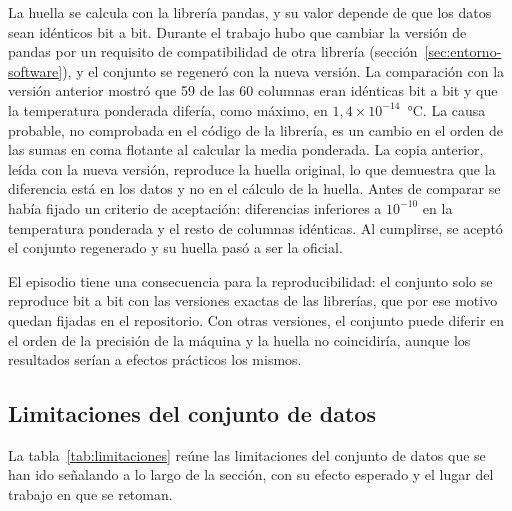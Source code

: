 La huella se calcula con la librería pandas, y su valor depende de que los
datos sean idénticos bit a bit. Durante el trabajo hubo que cambiar la
versión de pandas por un requisito de compatibilidad de otra librería
(sección~\ref{sec:entorno-software}), y el conjunto se regeneró con la
nueva versión. La comparación con la versión anterior mostró que 59 de las
60 columnas eran idénticas bit a bit y que la temperatura ponderada difería,
como máximo, en $1{,}4 \times 10^{-14}$~°C. La causa probable, no comprobada
en el código de la librería, es un cambio en el orden de las sumas en coma
flotante al calcular la media ponderada. La copia anterior, leída con la
nueva versión, reproduce la huella original, lo que demuestra que la
diferencia está en los datos y no en el cálculo de la huella. Antes de
comparar se había fijado un criterio de aceptación: diferencias inferiores a
$10^{-10}$ en la temperatura ponderada y el resto de columnas idénticas. Al
cumplirse, se aceptó el conjunto regenerado y su huella pasó a ser la
oficial.

El episodio tiene una consecuencia para la reproducibilidad: el conjunto solo
se reproduce bit a bit con las versiones exactas de las librerías, que por
ese motivo quedan fijadas en el repositorio. Con otras versiones, el conjunto
puede diferir en el orden de la precisión de la máquina y la huella no
coincidiría, aunque los resultados serían a efectos prácticos los mismos.

\subsection{Limitaciones del conjunto de datos}\label{sec:datos-limitaciones}

La tabla~\ref{tab:limitaciones} reúne las limitaciones del conjunto de datos
que se han ido señalando a lo largo de la sección, con su efecto esperado y
el lugar del trabajo en que se retoman.

